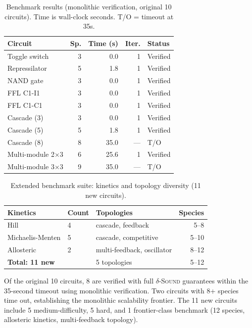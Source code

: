 \documentclass[11pt]{article}
\begin{document}
\begin{table}[t]
\centering
\caption{Benchmark results (monolithic verification, original 10 circuits).
  Time is wall-clock seconds. T/O = timeout at 35s.}
\label{tab:benchmarks}
\small
\begin{tabular}{lrrrl}
\toprule
\textbf{Circuit} & \textbf{Sp.} & \textbf{Time (s)} &
  \textbf{Iter.} & \textbf{Status} \\
\midrule
Toggle switch        &  3 &  0.0 &  1 & Verified \\
Repressilator        &  5 &  1.8 &  1 & Verified \\
NAND gate            &  3 &  0.0 &  1 & Verified \\
FFL C1-I1            &  3 &  0.0 &  1 & Verified \\
FFL C1-C1            &  3 &  0.0 &  1 & Verified \\
Cascade (3)          &  3 &  0.0 &  1 & Verified \\
Cascade (5)          &  5 &  1.8 &  1 & Verified \\
Cascade (8)          &  8 & 35.0 & --- & T/O \\
Multi-module 2$\times$3 &  6 & 25.6 &  1 & Verified \\
Multi-module 3$\times$3 &  9 & 35.0 & --- & T/O \\
\bottomrule
\end{tabular}
\end{table}

\begin{table}[t]
\centering
\caption{Extended benchmark suite: kinetics and topology diversity
  (11 new circuits).}
\label{tab:kinetics}
\small
\begin{tabular}{lllr}
\toprule
\textbf{Kinetics} & \textbf{Count} & \textbf{Topologies} & \textbf{Species} \\
\midrule
Hill               & 4  & cascade, feedback     & 5--8 \\
Michaelis-Menten   & 5  & cascade, competitive  & 5--10 \\
Allosteric         & 2  & multi-feedback, oscillator & 8--12 \\
\midrule
\multicolumn{2}{l}{\textbf{Total: 11 new}} & 5 topologies & 5--12 \\
\bottomrule
\end{tabular}
\end{table}

Of the original 10 circuits, 8 are verified with full
\textsc{$\delta$-Sound} guarantees within the 35-second timeout using
monolithic verification. Two circuits with 8+ species time out,
establishing the monolithic scalability frontier. The 11 new circuits
include 5 medium-difficulty, 5 hard, and 1 frontier-class benchmark
(12 species, allosteric kinetics, multi-feedback topology).
\end{document}
